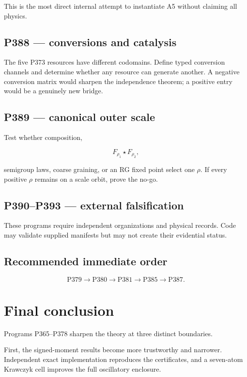 \documentclass[11pt,a4paper,openany]{report}
\begin{document}
This is the most direct internal attempt to instantiate A5 without claiming all physics.

\section{P388 --- conversions and catalysis}

The five P373 resources have different codomains. Define typed conversion channels and determine whether any resource can generate another. A negative conversion matrix would sharpen the independence theorem; a positive entry would be a genuinely new bridge.

\section{P389 --- canonical outer scale}

Test whether composition,

\[
F_{\rho_1}\star F_{\rho_2},
\]

semigroup laws, coarse graining, or an RG fixed point select one \(\rho\). If every positive \(\rho\) remains on a scale orbit, prove the no-go.

\section{P390--P393 --- external falsification}

These programs require independent organizations and physical records. Code may validate supplied manifests but may not create their evidential status.

\section{Recommended immediate order}

\[
\boxed{
\mathrm{P379}
\longrightarrow
\mathrm{P380}
\longrightarrow
\mathrm{P381}
\longrightarrow
\mathrm{P385}
\longrightarrow
\mathrm{P387}
}.
\]

\chapter{Final conclusion}

Programs P365--P378 sharpen the theory at three distinct boundaries.

First, the signed-moment results become more trustworthy and narrower. Independent exact implementation reproduces the certificates, and a seven-atom Krawczyk cell improves the full oscillatory enclosure.
\end{document}
